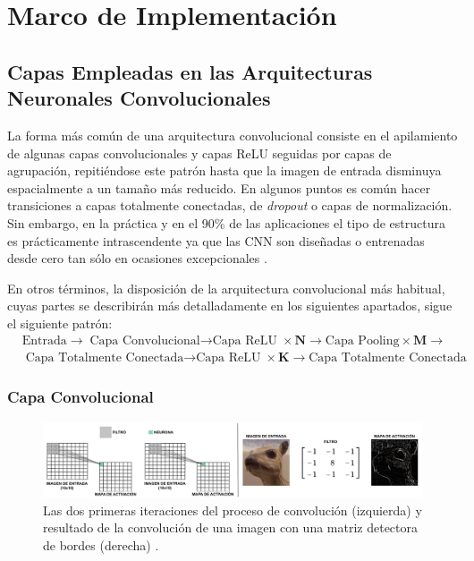 \renewcommand{\tablename}{Tabla}
\chapter{Marco de Implementación} \label{Chapter:3}

\section{Capas Empleadas en las Arquitecturas Neuronales Convolucionales} \label{Chapter:Layers}

La forma más común de una arquitectura convolucional consiste en el apilamiento de algunas capas convolucionales y capas ReLU seguidas por capas de agrupación, repitiéndose este patrón hasta que la imagen de entrada disminuya espacialmente a un tamaño más reducido. En algunos puntos es común hacer transiciones a capas totalmente conectadas, de \textit{dropout} o capas de normalización. Sin embargo, en la práctica y en el 90\% de las aplicaciones el tipo de estructura es prácticamente intrascendente ya que las CNN son diseñadas o entrenadas desde cero tan sólo en ocasiones excepcionales \cite{CS231n}.

En otros términos, la disposición de la arquitectura convolucional más habitual, cuyas partes se describirán más detalladamente en los siguientes apartados, sigue el siguiente patrón:
\begin{align*}
    &\boxed{\text{Entrada}} \rightarrow \boxed{\boxed{\text{Capa Convolucional} \rightarrow \text{Capa ReLU}} \times \textbf{N} \rightarrow \text{Capa Pooling}} \times \textbf{M} \rightarrow \\ 
    & \boxed{\text{Capa Totalmente Conectada} \rightarrow \text{Capa ReLU}} \times \textbf{K} \rightarrow \boxed{\text{Capa Totalmente Conectada}}
\end{align*}

\subsection{Capa Convolucional}

\begin{figure}
    \centering
    \includegraphics[width=\textwidth]{Images/ConvOperation.png}
    \caption{Las dos primeras iteraciones del proceso de convolución (izquierda) \cite{img:ConvOperation1} y resultado de la convolución de una imagen con una matriz detectora de bordes (derecha) \cite{img:ConvOperation2}.}
    \label{fig:ConvOperation}
\end{figure}


